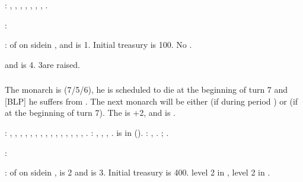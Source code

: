 : \provinceMoskva, \provinceKaluga,
\provinceNovgorod, \provinceNeva, \provinceOnega, \provinceLadoga,
\provinceYaroslavl, \provinceVyatka.

:
\begin{modlist}
\item[\MA] \paysKazan
\item[\RM] \paysCrimee
\end{modlist}

:
\bparag \MNU of  on side\facemoins in \provinceNovgorod, \FTI and
\DTI is 1.
\bparag Initial treasury is 100\ducats.
\bparag No \TradeFLEET.

\aparag {} and  is
4. 3\ARMY\faceplus are raised.


\subsubsection{\paysmajeurTurquie}
\aparag The monarch is  (7/5/6), he is scheduled to die
at the beginning of turn 7 and [BLP] he suffers from . The next monarch will be either  (if during
period ) or \monarqueSuleyman (if at the beginning of turn 7). The \STAB is
+2, and \TUR is .

: \provinceTrakya, \provinceCanakkale,
\provinceIzmir, \provinceBursa, \provinceMakedonya, \provinceBulgaristan,
\provinceKosovo, \provinceRumeli, \provinceKocaeli, \provinceTrabzon,
\provinceAngora, \provinceSinop, \provinceAntalya, \provinceKonya,
\provinceAnadolu, \provinceKilikya.
: \provinceAlabania, \provinceHellas, \provinceMoreas,
\provinceCaffa.
  is in  (\villeMecca).
: \seazoneRouge, \seazonePersique.
; .

:
\begin{modlist}
\item[\RM] \paysmoldavie
\item[\VASSAL] \paysvalachie
\end{modlist}

:
\bparag \MNU of  on side\facemoins in \provinceTrakya, \FTI is 2 and
\DTI is 3.
\bparag Initial treasury is 400\ducats.
\bparag \TradeFLEET level 2 in , level 2 in .

